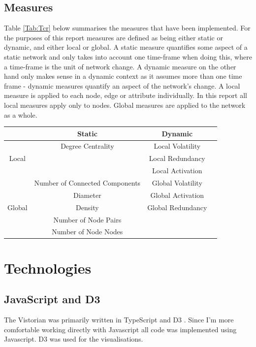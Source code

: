 \subsection{Measures}
Table \ref{Tab:Tcr} below summarises the measures that have been implemented. For the purposes of this report measures are defined as being either static or dynamic, and either local or global. A static measure quantifies some aspect of a static network and only takes into account one time-frame when doing this, where a time-frame is the unit of network change. A dynamic measure on the other hand only makes sense in a dynamic context as it assumes more than one time frame - dynamic measures quantify an aspect of the network's change. A local measure is applied to each node, edge or attribute individually. In this report all local measures apply only to nodes. Global measures are applied to the network as a whole.

\begin{center}
\begin{table}
\begin{tabular}{ |c|c|c|c| } 
\hline
 & Static & Dynamic \\
\hline
\multirow{3}{4em}{Local} & Degree Centrality & Local Volatility \\ 
& & Local Redundancy \\ 
& & Local Activation \\ 
\hline
\multirow{5}{4em}{Global} & Number of Connected Components & Global Volatility \\
 & Diameter & Global Activation \\
 & Density & Global Redundancy  \\
 & Number of Node Pairs &   \\
 & Number of Node Nodes &   \\
\hline
\end{tabular}
\end{table}
\end{center}


\section{Technologies}
\subsection{JavaScript and D3}
\label{sec:sec24}
The Vistorian was primarily written in TypeScript and D3 \cite{d3site}. Since I'm more comfortable working directly with Javascript all code was implemented using Javascript. D3 was used for the visualisations.

